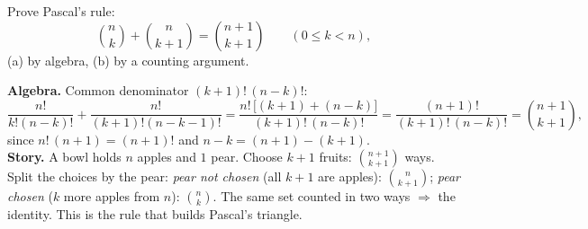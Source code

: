 
\begin{problem}
	Prove Pascal's rule:
	\[ \binom nk+\binom n{k+1}=\binom{n+1}{k+1} \qquad (0\le k<n), \]
	(a) by algebra, (b) by a counting argument.
\end{problem}

\begin{slides}
	\small
	\exstatement
	\pause
	\sol \textbf{Algebra.} Common denominator $(k+1)!\,(n-k)!$:
	\[
		\frac{n!}{k!(n-k)!}+\frac{n!}{(k+1)!(n-k-1)!}
		= \frac{n!\,\big[(k+1)+(n-k)\big]}{(k+1)!\,(n-k)!}
		= \frac{(n+1)!}{(k+1)!\,(n-k)!} = \binom{n+1}{k+1},
	\]
	since $n!\,(n+1)=(n+1)!$ and $n-k=(n+1)-(k+1)$.\\[1mm]
	\textbf{Story.} A bowl holds $n$ apples and $1$ pear. Choose $k+1$ fruits:
	$\binom{n+1}{k+1}$ ways. Split the choices by the pear:
	\emph{pear not chosen} (all $k+1$ are apples): $\binom n{k+1}$;
	\emph{pear chosen} ($k$ more apples from $n$): $\binom nk$.
	The same set counted in two ways $\Rightarrow$ the identity. This is the
	rule that builds Pascal's triangle.
\end{slides}

